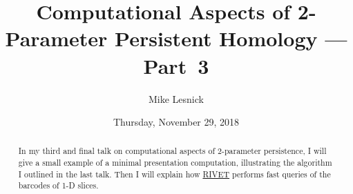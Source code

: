 \documentclass{UAmathtalk}
\author{Mike Lesnick}
\title{Computational Aspects of 2-Parameter Persistent Homology --- Part~3}
\date{Thursday, November 29, 2018}
\begin{document}
\maketitle

\begin{abstract}
In my third and final talk on computational aspects of 2-parameter persistence, I will give a small example of a minimal presentation computation, illustrating the algorithm I outlined in the last talk.  Then I will explain how \href{http://rivet.online}{RIVET} performs fast queries of the barcodes of 1-D slices.
\end{abstract}
\end{document}
